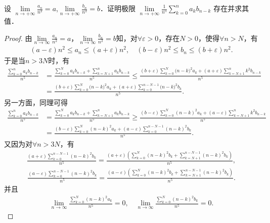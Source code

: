 \documentclass[../../main.tex]{subfiles}%
\begin{document}
\begin{example}
设 $\lim\limits_{n\rightarrow +\infty}\frac{a_n}{n^2}=a$,$\lim\limits_{n\rightarrow +\infty}\frac{b_n}{n^2}=b$．证明极限 $\lim\limits_{n\rightarrow +\infty}\frac{1}{n^5}\sum\limits_{k=0}^n a_k b_{n-k}$ 存在并求其值．
\end{example}
\begin{proof}
由$\lim\limits_{n\rightarrow \infty}\frac{a_n}{n^2}=a$，$\lim\limits_{n\rightarrow \infty}\frac{b_n}{n^2}=b$知，对$\forall \varepsilon >0$，存在$N>0$，使得$\forall n>N$，有
\begin{align*}
(a-\varepsilon) n^2\leqslant a_n\leqslant (a+\varepsilon) n^2,\quad (b-\varepsilon) n^2\leqslant b_n\leqslant (b+\varepsilon) n^2.
\end{align*}
于是当$n>3N$时，有
\begin{align*}
\frac{\sum\limits_{k=0}^n{a_kb_{n-k}}}{n^5}&=\frac{\sum\limits_{k=0}^N{a_kb_{n-k}}+\sum\limits_{k=N+1}^n{a_kb_{n-k}}}{n^5}\leqslant \frac{(b+\varepsilon )\sum\limits_{k=0}^N{(n}-k)^2a_k+(a+\varepsilon )\sum\limits_{k=N+1}^n{k^2b_{n-k}}}{n^5}
\\
&=\frac{(b+\varepsilon )\sum\limits_{k=0}^N{(n}-k)^2a_k+(a+\varepsilon )\sum\limits_{k=0}^{n-N-1}{(n}-k)^2b_k}{n^5}.
\end{align*}
另一方面，同理可得
\begin{align*}
\frac{\sum\limits_{k=0}^n a_kb_{n-k}}{n^5}&=\frac{\sum\limits_{k=0}^N a_kb_{n-k}+\sum\limits_{k=N+1}^n a_kb_{n-k}}{n^5}\geqslant \frac{(b-\varepsilon) \sum\limits_{k=0}^N (n-k)^2a_k+(a-\varepsilon) \sum\limits_{k=N+1}^n k^2b_{n-k}}{n^5}
\\
&=\frac{(b-\varepsilon) \sum\limits_{k=0}^N (n-k)^2a_k+(a-\varepsilon) \sum\limits_{k=0}^{n-N-1} (n-k)^2b_k}{n^5}.
\end{align*}
又因为对$\forall n>3N$，有
\begin{align*}
\frac{(a+\varepsilon) \sum\limits_{k=0}^{n-N-1} (n-k)^2b_k}{n^5}=\frac{(a+\varepsilon) \left( \sum\limits_{k=0}^N (n-k)^2b_k+\sum\limits_{k=N+1}^{n-N-1} (n-k)^2b_k \right)}{n^5},
\end{align*}
\begin{align*}
\frac{(a-\varepsilon) \sum\limits_{k=0}^{n-N-1} (n-k)^2b_k}{n^5}=\frac{(a-\varepsilon) \left( \sum\limits_{k=0}^N (n-k)^2b_k+\sum\limits_{k=N+1}^{n-N-1} (n-k)^2b_k \right)}{n^5}.
\end{align*}
并且
\begin{align*}
\lim\limits_{n\rightarrow \infty}\frac{\sum\limits_{k=0}^N (n-k)^2a_k}{n^5}=0,\quad \lim\limits_{n\rightarrow \infty}\frac{\sum\limits_{k=0}^N (n-k)^2b_k}{n^5}=0.

\end{align*}
\end{proof}
\end{document}
